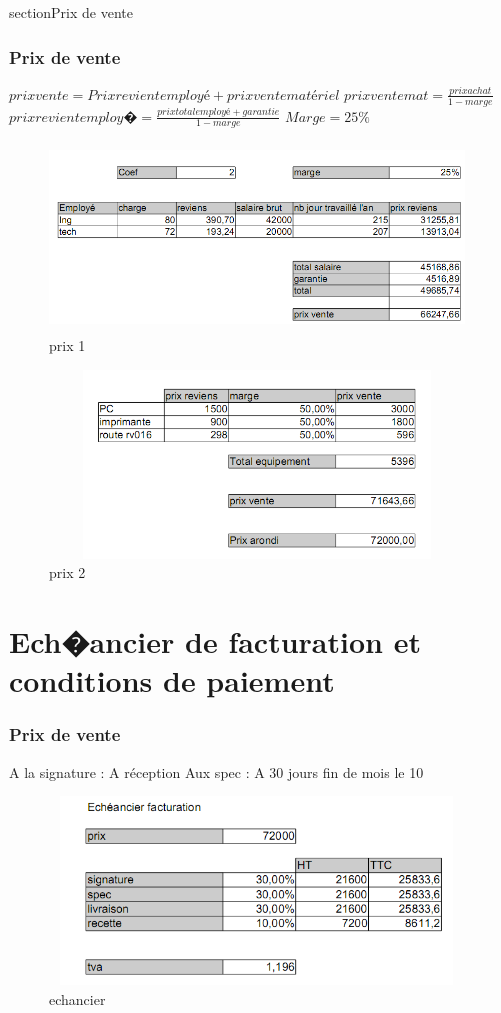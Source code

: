 \documentclass{beamer}
\begin{document}
section{Prix de vente}

\begin{frame}\frametitle{Prix de vente}

$ prix vente= Prix revient employé + prix vente matériel $ 
$ prix vente mat= \frac {prix achat} {1-marge} $
$ prix revient employ� = \frac {prix total employé + garantie} { 1-marge} $
$ Marge = 25\% $
\begin{figure}[t]
\centering
\includegraphics[height=5cm,width=11cm]{images/prix1.PNG}
\caption{prix 1}
\label{prix 1}
\end{figure}
\begin{figure}[t]
\centering
\includegraphics[height=5cm,width=11cm]{images/prix2.PNG}
\caption{prix 2}
\label{prix 2}
\end{figure}


\end{frame}

\section{Ech�ancier de facturation et conditions de paiement}
\begin{frame}\frametitle{Prix de vente}
A la signature :
A réception 
Aux spec : 
A 30 jours fin de mois le 10
\begin{figure}[t]
\centering
\includegraphics[height=5cm,width=11cm]{images/echancier.PNG}
\caption{echancier}
\label{echancier}
\end{figure}


\end{frame}
\end{document}
